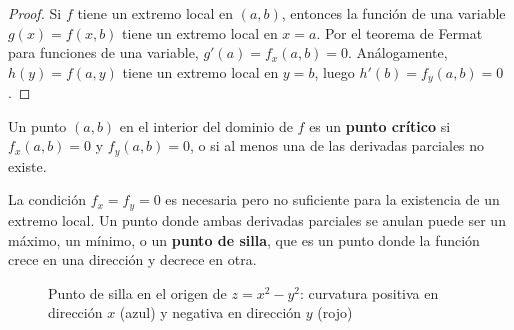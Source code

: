 \begin{proof}
Si $f$ tiene un extremo local en $(a,b)$, entonces la función de una
variable $g(x) = f(x,b)$ tiene un extremo local en $x=a$. Por el
teorema de Fermat para funciones de una variable, $g'(a)=f_x(a,b)=0$.
Análogamente, $h(y)=f(a,y)$ tiene un extremo local en $y=b$, luego
$h'(b)=f_y(a,b)=0$.
\end{proof}

\begin{definition}
Un punto $(a,b)$ en el interior del dominio de $f$ es un
\textbf{punto crítico} si $f_x(a,b)=0$ y $f_y(a,b)=0$, o si al menos
una de las derivadas parciales no existe.
\end{definition}

\begin{rem}
La condición $f_x=f_y=0$ es necesaria pero no suficiente para la
existencia de un extremo local. Un punto donde ambas derivadas parciales
se anulan puede ser un máximo, un mínimo, o un \textbf{punto de silla},
que es un punto donde la función crece en una dirección y decrece en
otra.
\end{rem}

\begin{figure}[!htbp]
\centering
{}
\caption{Punto de silla en el origen de $z=x^2-y^2$: curvatura positiva
         en dirección $x$ (azul) y negativa en dirección $y$ (rojo)}
\label{fig:punto_silla}
\end{figure}


